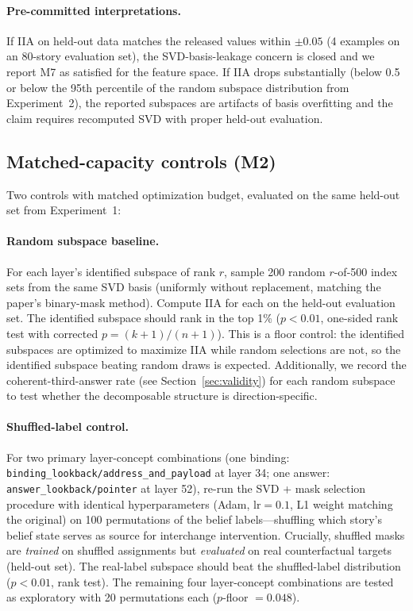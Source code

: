 \documentclass{article}
\begin{document}
\paragraph{Pre-committed interpretations.} If IIA on held-out data matches the released values within $\pm 0.05$ (4 examples on an 80-story evaluation set), the SVD-basis-leakage concern is closed and we report M7 as satisfied for the feature space. If IIA drops substantially (below 0.5 or below the 95th percentile of the random subspace distribution from Experiment~2), the reported subspaces are artifacts of basis overfitting and the claim requires recomputed SVD with proper held-out evaluation.

\subsection{Matched-capacity controls (M2)}

Two controls with matched optimization budget, evaluated on the same held-out set from Experiment~1:

\paragraph{Random subspace baseline.} For each layer's identified subspace of rank $r$, sample 200 random $r$-of-500 index sets from the same SVD basis (uniformly without replacement, matching the paper's binary-mask method). Compute IIA for each on the held-out evaluation set. The identified subspace should rank in the top 1\% ($p < 0.01$, one-sided rank test with corrected $p = (k + 1)/(n + 1)$). This is a floor control: the identified subspaces are optimized to maximize IIA while random selections are not, so the identified subspace beating random draws is expected. Additionally, we record the coherent-third-answer rate (see Section~\ref{sec:validity}) for each random subspace to test whether the decomposable structure is direction-specific.

\paragraph{Shuffled-label control.} For two primary layer-concept combinations (one binding: \texttt{binding\_lookback/address\_and\_payload} at layer 34; one answer: \texttt{answer\_lookback/pointer} at layer 52), re-run the SVD + mask selection procedure with identical hyperparameters (Adam, $\text{lr} = 0.1$, L1 weight matching the original) on 100 permutations of the belief labels---shuffling which story's belief state serves as source for interchange intervention. Crucially, shuffled masks are \emph{trained} on shuffled assignments but \emph{evaluated} on real counterfactual targets (held-out set). The real-label subspace should beat the shuffled-label distribution ($p < 0.01$, rank test). The remaining four layer-concept combinations are tested as exploratory with 20 permutations each ($p$-floor $= 0.048$).
\end{document}
